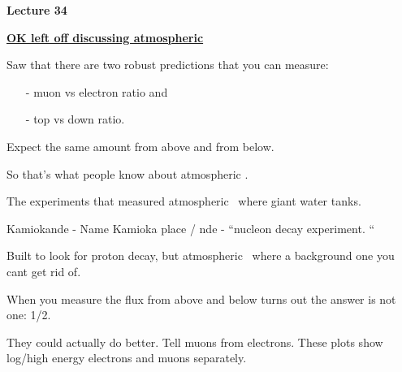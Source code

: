 \usepackage{fancyhdr}

\fancyhf{}


\thispagestyle{fancy}

\begin{center}
{\huge \textbf{Lecture 34}}
\end{center}

{\fontsize{14}{16}\selectfont

\textbf{\underline{OK left off discussing atmospheric \nus}} 

Saw that there are two robust predictions that you can measure:
\begin{itemize}
\item[-]muon vs electron ratio and
\item[-]top vs down ratio. 
\end{itemize}

Expect the same amount from above and from below.

So that's what people know about atmospheric \nus. 

The experiments that measured atmospheric \nus\ where giant water tanks.

Kamiokande - Name Kamioka place / nde - ``nucleon decay experiment. ``

Built to look for proton decay, but atmospheric \nus\ where a background one you cant get rid of. 

When you measure the flux from above and below turns out the answer is not one: 1/2.

They could actually do better. 
Tell muons from electrons.
These plots show log/high energy electrons and muons separately. 
\clearpage

}
